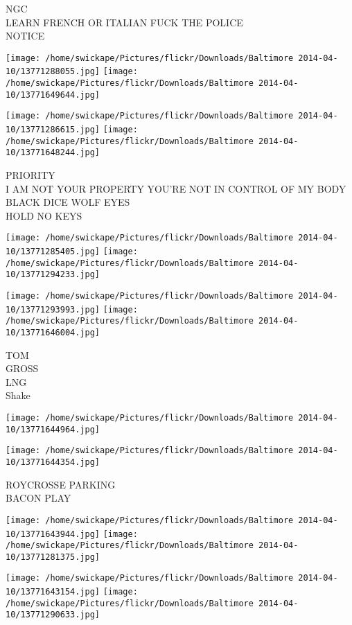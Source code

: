 \documentclass[10pt,letterpaper]{article}
\begin{document}
NGC\\
LEARN FRENCH OR ITALIAN FUCK THE POLICE\\
NOTICE
\pagebreak

\texttt{[image: /home/swickape/Pictures/flickr/Downloads/Baltimore 2014-04-10/13771288055.jpg]}
\texttt{[image: /home/swickape/Pictures/flickr/Downloads/Baltimore 2014-04-10/13771649644.jpg]}

\texttt{[image: /home/swickape/Pictures/flickr/Downloads/Baltimore 2014-04-10/13771286615.jpg]}
\texttt{[image: /home/swickape/Pictures/flickr/Downloads/Baltimore 2014-04-10/13771648244.jpg]}

PRIORITY\\
I AM NOT YOUR PROPERTY YOU'RE NOT IN CONTROL OF MY BODY\\
BLACK DICE WOLF EYES\\
HOLD NO KEYS
\pagebreak

\texttt{[image: /home/swickape/Pictures/flickr/Downloads/Baltimore 2014-04-10/13771285405.jpg]}
\texttt{[image: /home/swickape/Pictures/flickr/Downloads/Baltimore 2014-04-10/13771294233.jpg]}

\texttt{[image: /home/swickape/Pictures/flickr/Downloads/Baltimore 2014-04-10/13771293993.jpg]}
\texttt{[image: /home/swickape/Pictures/flickr/Downloads/Baltimore 2014-04-10/13771646004.jpg]}

TOM\\
GROSS\\
LNG\\
Shake
\pagebreak

\texttt{[image: /home/swickape/Pictures/flickr/Downloads/Baltimore 2014-04-10/13771644964.jpg]}

\vspace{0.25in}
\texttt{[image: /home/swickape/Pictures/flickr/Downloads/Baltimore 2014-04-10/13771644354.jpg]}

ROYCROSSE PARKING\\
BACON PLAY
\pagebreak

\texttt{[image: /home/swickape/Pictures/flickr/Downloads/Baltimore 2014-04-10/13771643944.jpg]}
\texttt{[image: /home/swickape/Pictures/flickr/Downloads/Baltimore 2014-04-10/13771281375.jpg]}

\texttt{[image: /home/swickape/Pictures/flickr/Downloads/Baltimore 2014-04-10/13771643154.jpg]}
\texttt{[image: /home/swickape/Pictures/flickr/Downloads/Baltimore 2014-04-10/13771290633.jpg]}
\end{document}
